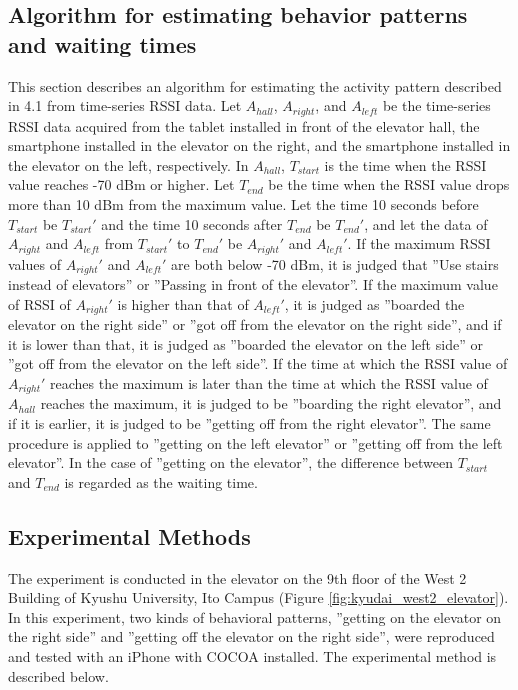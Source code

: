 \subsection{Algorithm for estimating behavior patterns and waiting times}
This section describes an algorithm for estimating the activity pattern described in 4.1 from time-series RSSI data.
Let $A_{hall}$, $A_{right}$, and $A_{left}$ be the time-series RSSI data acquired from the tablet installed in front of the elevator hall, the smartphone installed in the elevator on the right, and the smartphone installed in the elevator on the left, respectively. In $A_{hall}$, $T_{start}$ is the time when the RSSI value reaches -70 dBm or higher. Let $T_{end}$ be the time when the RSSI value drops more than 10 dBm from the maximum value. Let the time 10 seconds before $T_{start}$ be $T_{start}'$ and the time 10 seconds after $T_{end}$ be $T_{end}'$, and let the data of $A_{right}$ and $A_{left}$ from $T_{start}'$ to $T_{end}'$ be $A_{right}'$ and $A_{left}'$. If the maximum RSSI values of $A_{right}'$ and $A_{left}'$ are both below -70 dBm, it is judged that ''Use stairs instead of elevators'' or ''Passing in front of the elevator''. If the maximum value of RSSI of $A_{right}'$ is higher than that of $A_{left}'$, it is judged as ''boarded the elevator on the right side'' or ''got off from the elevator on the right side'', and if it is lower than that, it is judged as ''boarded the elevator on the left side'' or ''got off from the elevator on the left side''. If the time at which the RSSI value of $A_{right}'$ reaches the maximum is later than the time at which the RSSI value of $A_{hall}$ reaches the maximum, it is judged to be ''boarding the right elevator'', and if it is earlier, it is judged to be ''getting off from the right elevator''. The same procedure is applied to ''getting on the left elevator'' or ''getting off from the left elevator''. In the case of ''getting on the elevator'', the difference between $T_{start}$ and $T_{end}$ is regarded as the waiting time.


\subsection{Experimental Methods}

The experiment is conducted in the elevator on the 9th floor of the West 2 Building of Kyushu University, Ito Campus (Figure \ref{fig:kyudai_west2_elevator}). In this experiment, two kinds of behavioral patterns, ''getting on the elevator on the right side'' and ''getting off the elevator on the right side'', were reproduced and tested with an iPhone with COCOA installed. The experimental method is described below.

